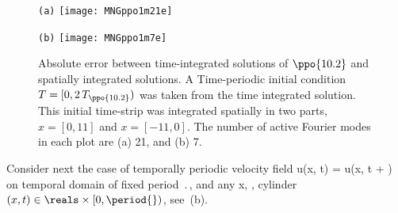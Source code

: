 \begin{figure}[ht]
\begin{minipage}[height=.45\textheight]{.45\textwidth}
\centering \small{\texttt{(a)}}
\texttt{[image: MNGppo1m21e]}
\end{minipage}
\begin{minipage}[height=.45\textheight]{.45\textwidth}
\centering \small{\texttt{(b)}}
\texttt{[image: MNGppo1m7e]}
\end{minipage}
\caption{\label{fig:MNGppo1error}
Absolute error between time-integrated solutions of $\ppo{10.2}$ and spatially integrated solutions.
A Time-periodic initial condition $T = [0,2\,T_{\ppo{10.2}})$ was taken from the time integrated solution.
This initial time-strip was integrated spatially in two parts, $x = [0,11]$ and $x = [-11,0]$. The number of active Fourier modes in each plot are (a) 21, and (b) 7.
}
\end{figure}


Consider next the case of temporally periodic velocity field
\beq
    u(x, t) = u(x, t + \period{})
\label{e-PeriodicBC}
\eeq
on temporal domain of fixed period $\period{}$,
and any x, \ie, cylinder $(x,t) \in \reals \times [0,\period{})$, see
\,(b).

